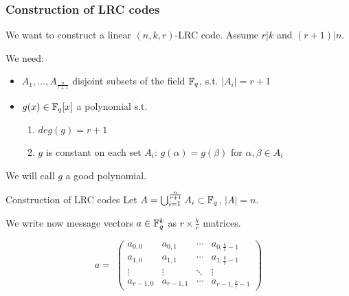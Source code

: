 \begin{frame}
        \frametitle{Construction of LRC codes}
        We want to construct a linear $(n,k,r)$-LRC code. Assume $r \vert k$ and $(r+1) \vert n$.
        
        We need:
        
        \begin{itemize}
            \item $A_1 , \dots , A_{\frac{n}{r+1}}$ disjoint subsets of the field $\mathbb{F}_q$, s.t. $\vert A_i \vert = r+1$
            \item $g(x) \in \mathbb{F}_q[x]$ a polynomial s.t.
            \begin{enumerate}
                \item $deg(g) = r+1$
                \item $g$ is constant on each set $A_i$: $g(\alpha) = g(\beta)$ for $\alpha, \beta \in A_i$
            \end{enumerate}
        \end{itemize}                
        We will call $g$ a good polynomial.
        
    \end{frame}
    
    \begin{frame}{Construction of LRC codes}
        Let $A= \bigcup_{i=1}^{\frac{n}{r+1}} A_i \subset \mathbb{F}_q$, $\vert A \vert = n$.
        
        We write now message vectors $a \in \mathbb{F}_q^k$ as $r \times \frac{k}{r}$ matrices.
        
        $$ a = \;
        \begin{pmatrix}
            a_{0,0} & a_{0,1} & \cdots & a_{0,\frac{k}{r}-1} \\
            a_{1,0} & a_{1,1} & \cdots & a_{1,\frac{k}{r}-1} \\
            \vdots  & \vdots  & \ddots & \vdots \\
            a_{r-1,0} & a_{r-1,1} & \cdots & a_{r-1,\frac{k}{r}-1}
        \end{pmatrix}
        $$
    \end{frame}
    
